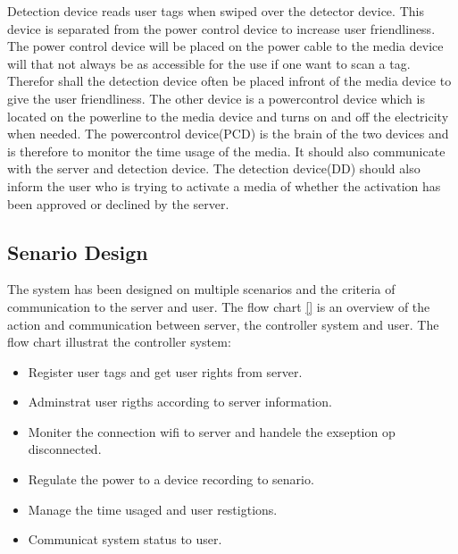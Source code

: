 Detection device reads user tags when swiped over the detector device. This device is separated from the power control device to increase user friendliness. The power control device will be placed on the power cable to the media device will that not always be as accessible for the use if one want to scan a tag. Therefor shall the detection device often be placed infront of the media device to give the user friendliness.\newline
The other device is a powercontrol device which is located on the powerline to the media device and turns on and off the electricity when needed.\newline
The powercontrol device(PCD) is the brain of the two devices and is therefore to monitor the time usage of the media. It should also communicate with the server and detection device. \newline
The detection device(DD) should also inform the user who is trying to activate a media of whether the activation has been approved or declined by the server.

\subsection{Senario Design}
\label{subsec:senarioD}

The system has been designed on multiple scenarios and the criteria of communication to the server and user. The flow chart \ref{} is an overview of the action and communication between server, the controller system and user. The flow chart illustrat the controller system:

\begin{itemize}	
	\item Register user tags and get user rights from server. 
	\item Adminstrat user rigths according to server information.
	\item Moniter the connection wifi to server and handele the exseption op disconnected. 
	\item Regulate the power to a device recording to senario.
	\item Manage the time usaged and user restigtions.
	\item Communicat system status to user.
\end{itemize}

